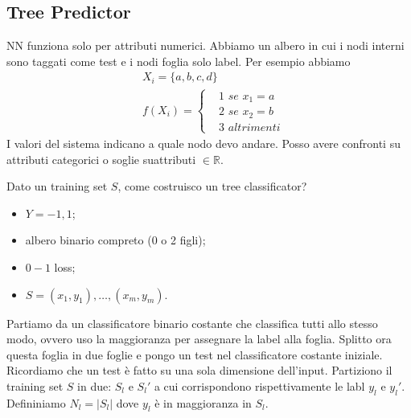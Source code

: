 \documentclass{article}
\begin{document}
\subsection{Tree Predictor}
NN funziona solo per attributi numerici. Abbiamo un albero in cui i nodi interni sono taggati come test e i nodi foglia solo label. Per esempio abbiamo
\begin{displaymath}
	\begin{split}
		&X_i=\{a,b,c,d \} \\
		&f(X_i)=
			\begin{cases}
				&1 \textit{ se } x_1=a \\
				&2 \textit{ se } x_2=b \\
				&3 \textit{ altrimenti}
			\end{cases}
	\end{split}
\end{displaymath}
I valori del sistema indicano a quale nodo devo andare. Posso avere confronti su attributi categorici o soglie suattributi $\in \mathbb{R}$.



Dato un training set $S$, come costruisco un tree classificator?
\begin{itemize}
	\item $Y={-1,1}$;
	\item albero binario compreto (0 o 2 figli);
	\item $0-1$ loss;
	\item $S=(x_1,y_1), \dots, (x_m,y_m)$.
\end{itemize}
Partiamo da un classificatore binario costante che classifica tutti allo stesso modo, ovvero uso la maggioranza per assegnare la label alla foglia. Splitto ora questa foglia in due foglie e pongo un test nel classificatore costante iniziale. Ricordiamo che un test è fatto su una sola dimensione dell'input. Partiziono il training set $S$ in due: $S_l$ e $S_l'$ a cui corrispondono rispettivamente le labl $y_l$ e $y_l'$. Defininiamo $N_l=|S_l|$ dove $y_l$ è in maggioranza in $S_l$.
\end{document}
